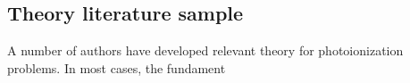 \subsection{Theory literature sample\label{sec:theory-lit}}

A number of authors have developed relevant theory for photoionization problems. In most cases, the fundament